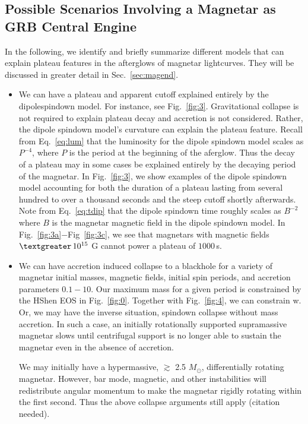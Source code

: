 \documentclass{article}
\begin{document}
\subsection{Possible Scenarios Involving a Magnetar as GRB Central Engine} \label{sec:42}

In the following, we identify and briefly summarize different models that can explain plateau features in the afterglows of magnetar lightcurves. They will be discussed in greater detail in Sec.~\ref{sec:magend}.

\begin{itemize}
\item We can have a plateau and apparent cutoff explained entirely by the dipolespindown model. For instance, see Fig.~\ref{fig:3}. Gravitational collapse is not required to explain plateau decay and accretion is not considered. Rather, the dipole spindown model's curvature can explain the plateau feature. Recall from Eq.~\ref{eq:lum} that the luminosity for the dipole spindown model scales as $P^{-4}$, where $P$ is the period at the beginning of the aferglow. Thus the decay of a plateau may in some cases be explained entirely by the decaying period of the magnetar. In Fig.~\ref{fig:3}, we show examples of the dipole spindown model accounting for both the duration of a plateau lasting from several hundred to over a thousand seconds and the steep cutoff shortly afterwards. Note from Eq.~\ref{eq:tdip} that the dipole spindown time roughly scales as $B^{-2}$ where $B$ is the magnetar magnetic field in the dipole spindown model. In Fig.~\ref{fig:3a}$-$Fig~\ref{fig:3c}, we see that magnetars with magnetic fields $\textgreater\,10^{15}$ G cannot power a plateau of $1000$\,s. \newline

\item We can have accretion induced collapse to a blackhole for a variety of magnetar initial masses, magnetic fields, initial spin periods, and accretion parameters $0.1-10$. Our maximum mass for a given period is constrained by the HShen EOS in Fig.~\ref{fig:0}. Together with Fig.~\ref{fig:4}, we can constrain w. Or, we may have the inverse situation, spindown collapse without mass accretion. In such a case, an initially rotationally supported supramassive magnetar slows until centrifugal support is no longer able to sustain the magnetar even in the absence of accretion.  \newline

We may initially have a hypermassive, $\gtrsim$ 2.5 $M_{\odot}$,  differentially rotating magnetar. However, bar mode, magnetic, and other instabilities will redistribute angular momentum to make the magnetar rigidly rotating within the first second. Thus the above collapse arguments still apply (citation needed). \newline


\end{itemize}
\end{document}
